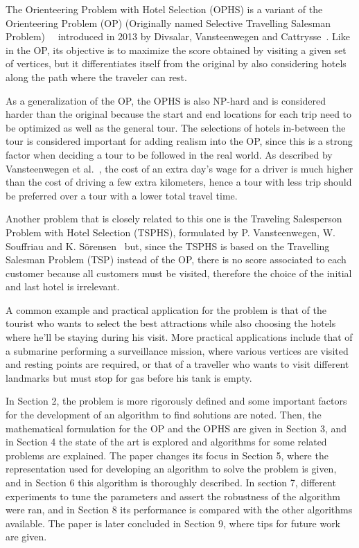 The Orienteering Problem with Hotel Selection (OPHS) is a variant of the Orienteering Problem (OP) (Originally named Selective Travelling Salesman Problem)~\cite{tsiligirides1984}~\cite{laporte1990} introduced in 2013 by Divsalar, Vansteenwegen and Cattrysse~\cite{divsalar2013}. Like in the OP, its objective is to maximize the score obtained by visiting a given set of vertices, but it differentiates itself from the original by also considering hotels along the path where the traveler can rest.

As a generalization of the OP, the OPHS is also NP-hard and is considered harder than the original because the start and end locations for each trip need to be optimized as well as the general tour. The selections of hotels in-between the tour is considered important for adding realism into the OP, since this is a strong factor when deciding a tour to be followed in the real world. As described by Vansteenwegen et al.~\cite{vansteenwegen2012}, the cost of an extra day's wage for a driver is much higher than the cost of driving a few extra kilometers, hence a tour with less trip should be preferred over a tour with a lower total travel time.

Another problem that is closely related to this one is the Traveling Salesperson Problem with Hotel Selection (TSPHS), formulated by P. Vansteenwegen, W. Souffriau and K. S\"orensen~\cite{vansteenwegen2012} but, since the TSPHS is based on the Travelling Salesman Problem (TSP) instead of the OP, there is no score associated to each customer because all customers must be visited, therefore the choice of the initial and last hotel is irrelevant.

A common example and practical application for the problem is that of the tourist who wants to select the best attractions while also choosing the hotels where he'll be staying during his visit. More practical applications include that of a submarine performing a surveillance mission, where various vertices are visited and resting points are required, or that of a traveller who wants to visit different landmarks but must stop for gas before his tank is empty.

In Section 2, the problem is more rigorously defined and some important factors for the development of an algorithm to find solutions are noted. Then, the mathematical formulation for the OP and the OPHS are given in Section 3, and in Section 4 the state of the art is explored and algorithms for some related problems are explained. The paper changes its focus in Section 5, where the representation used for developing an algorithm to solve the problem is given, and in Section 6 this algorithm is thoroughly described. In section 7, different experiments to tune the parameters and assert the robustness of the algorithm were ran, and in Section 8 its performance is compared with the other algorithms available. The paper is later concluded in Section 9, where tips for future work are given.